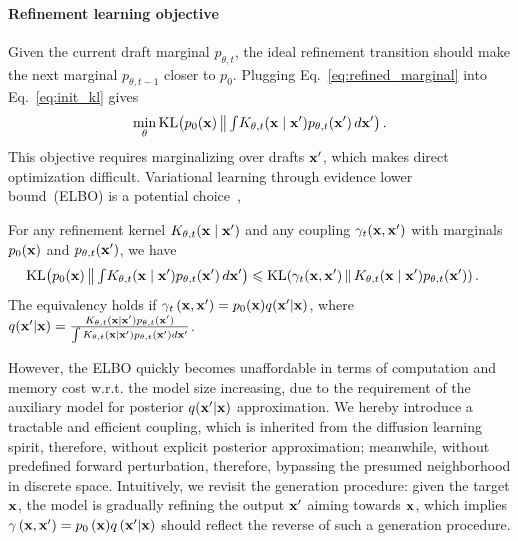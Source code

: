 \paragraph{Refinement learning objective}
Given the current draft marginal $p_{\theta,t}$, the ideal refinement transition should make the next marginal $p_{\theta,t-1}$ closer to $p_0$. 
Plugging Eq.~\eqref{eq:refined_marginal} into Eq.~\eqref{eq:init_kl} gives
\begin{equation}
    \min_{\theta}
    \operatorname{KL}\!\left(
        p_0(\mathbf{x})
        \,\middle\|\,
        {\textstyle \int}
        K_{\theta,t}(\mathbf{x}\mid \mathbf{x}')
        p_{\theta,t}(\mathbf{x}')
        \,d\mathbf{x}'
    \right).
    \label{eq:ideal_refinement}
\end{equation}
This objective requires marginalizing over drafts $\mathbf{x}'$, which makes direct optimization difficult. Variational learning through evidence lower bound~(ELBO) is a potential choice~\citep{alias2017variational}, 
\begin{proposition}
\label{prop:joint_surrogate}
For any refinement kernel $K_{\theta,t}(\mathbf{x}\mid\mathbf{x}')$ and any coupling $\gamma_t(\mathbf{x},\mathbf{x}')$ with marginals $p_0(\mathbf{x})$ and $p_{\theta,t}(\mathbf{x}')$, we have
\begin{equation}
\begin{aligned}
    \operatorname{KL}\!\left(
        p_0(\mathbf{x})
        \,\middle\|\,
        {\textstyle \int}
        K_{\theta,t}(\mathbf{x}\mid \mathbf{x}')
        p_{\theta,t}(\mathbf{x}')
        \,d\mathbf{x}'
    \right)
    &\leqslant
    \operatorname{KL}\!\left(
        \gamma_t(\mathbf{x},\mathbf{x}')
        \,\middle\|\,
        K_{\theta,t}(\mathbf{x}\mid\mathbf{x}')p_{\theta,t}(\mathbf{x}')
    \right).
    \label{eq:joint_surrogate_bound}
\end{aligned}
\end{equation}
The equivalency holds if $\gamma_t\left(\mathbf{x}, \mathbf{x}'\right) = p_0(\mathbf{x})q(\mathbf{x}'|\mathbf{x})$, where $q(\mathbf{x}'|\mathbf{x})=\frac{K_{\theta,t}(\mathbf{x}\mid\mathbf{x}')p_{\theta,t}(\mathbf{x}')}{\int K_{\theta,t}(\mathbf{x}\mid\mathbf{x}')p_{\theta,t}(\mathbf{x}') d\mathbf{x}' }$.
\end{proposition}
However, the ELBO quickly becomes unaffordable in terms of computation and memory cost w.r.t. the model size increasing, due to the requirement of the auxiliary model for posterior $q(\mathbf{x}'|\mathbf{x})$ approximation.
We hereby introduce a tractable and efficient coupling, which is inherited from the diffusion learning spirit, therefore, without explicit posterior approximation; meanwhile, without predefined forward perturbation, therefore, bypassing the presumed neighborhood in discrete space. 
Intuitively, we revisit the generation procedure: given the target $\mathbf{x}$, the model is gradually refining the output $\mathbf{x}'$ aiming towards $\mathbf{x}$, which implies ${\gamma\left(\mathbf{x}, \mathbf{x}'\right)} =  {p_0\left(\mathbf{x}\right)}q\left(\mathbf{x}'|\mathbf{x}\right)$ should reflect the reverse of such a generation procedure. 
